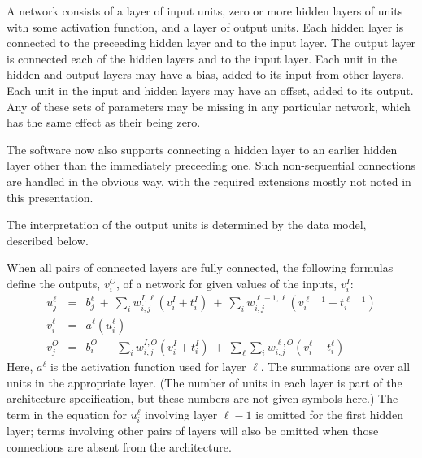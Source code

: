 \documentclass{report}[11pt]
\def\beq{\begin{eqnarray}}
\def\eeq{\end{eqnarray}}
\begin{document}
A network consists of a layer of input units, zero or more hidden
layers of units with some activation function, and a layer of output
units.  Each hidden layer is connected to the preceeding hidden layer
and to the input layer.  The output layer is connected each of the
hidden layers and to the input layer.  Each unit in the hidden and
output layers may have a bias, added to its input from other layers.
Each unit in the input and hidden layers may have an offset, added to
its output.  Any of these sets of parameters may be missing in any
particular network, which has the same effect as their being zero.

The software now also supports connecting a hidden layer to an
earlier hidden layer other than the immediately preceeding one.  Such
non-sequential connections are handled in the obvious way, with 
the required extensions mostly not noted in this presentation.

The interpretation of the output units is determined by the data
model, described below.

When all pairs of connected layers are fully connected, the following 
formulas define the outputs, $v^O_i$, of a network for given values 
of the inputs, $v^I_i$:\beq
  u^{\ell}_j & = & b^{\ell}_j \ +\ \sum_i w^{I,\ell}_{i,j} (v^I_i+t^I_i) 
                   \ +\ \sum_i w^{\ell-1,\ell}_{i,j} (v^{\ell-1}_i+t^{\ell-1}_i)
     \label{func1} \\[3pt]
  v^{\ell}_i & = & a^{\ell}(u^{\ell}_i) \label{func2} \\[5pt]
  v^O_j\!    & = & b^O_i \ +\ \sum_i w^{I,O}_{i,j} (v^I_i+t^I_i) 
             \ +\ \sum_{\ell} \sum_i w^{\ell,O}_{i,j} (v^{\ell}_i+t^{\ell}_i)
\label{func3}\eeq%
Here, $a^{\ell}$ is the activation function used for layer $\ell$.
The summations are over all units in the appropriate layer.  (The
number of units in each layer is part of the architecture
specification, but these numbers are not given symbols here.)  The
term in the equation for $u^{\ell}_i$ involving layer $\ell\!-\!1$ is
omitted for the first hidden layer; terms involving other pairs of
layers will also be omitted when those connections are absent from the
architecture.
\end{document}

